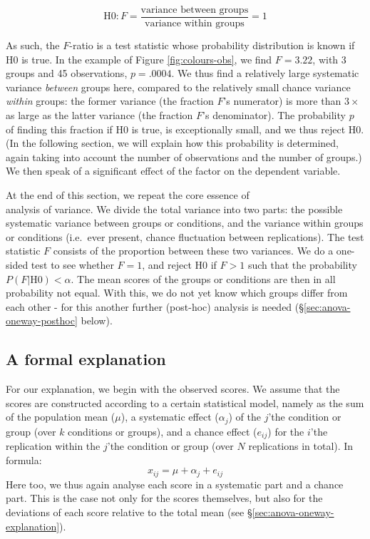 \documentclass[
]{book}
\begin{document}
\[\textrm{H0}: F = \frac{\textrm{variance between groups}}{\textrm{variance within groups}} = 1\]

As such, the \(F\)-ratio is a test statistic whose probability distribution
is known if H0 is true. In the example of Figure
\ref{fig:colours-obs}, we find \(F=3.22\), with 3 groups and 45
observations, \(p=.0004\). We thus find a relatively large systematic
variance \emph{between} groups here, compared to the relatively
small chance variance \emph{within} groups: the former variance
(the fraction \(F\)'s numerator) is more than \(3\times\) as large as the
latter variance (the fraction \(F\)'s denominator). The probability
\(p\) of finding this fraction if H0 is true, is exceptionally small,
and we thus reject H0. (In the following section, we will explain how
this probability is determined, again taking into account the number of
observations and the number of groups.) We then speak of a significant effect
of the factor on the dependent variable.

At the end of this section, we repeat the core essence of\\
analysis of variance. We divide the total variance into two parts: the
possible systematic variance between groups or conditions, and the
variance within groups or conditions (i.e.~ever present, chance
fluctuation between replications). The test statistic \(F\) consists of the
proportion between these two variances. We do a one-sided test to see
whether \(F=1\), and reject H0 if \(F>1\) such that the probability
\(P(F|\textrm{H0}) < \alpha\). The mean scores of the groups or conditions
are then in all probability not equal. With this, we do not yet know
which groups differ from each other - for this another further
(post-hoc) analysis is needed
(§\ref{sec:anova-oneway-posthoc} below).

\hypertarget{sec:anova-oneway-formal}{%
\subsection{A formal explanation}\label{sec:anova-oneway-formal}}

For our explanation, we begin with the observed scores. We assume that
the scores are constructed according to a certain statistical model, namely
as the sum of the population mean (\(\mu\)), a systematic
effect (\(\alpha_j\)) of the \(j\)'the condition or group (over \(k\) conditions
or groups), and a chance effect (\(e_{ij}\)) for the \(i\)'the replication within
the \(j\)'the condition or group (over \(N\) replications in
total). In formula:
\[x_{ij} = \mu + \alpha_{j} + e_{ij}\]
Here too, we thus again analyse each score in a systematic part and
a chance part. This is the case not only for the scores themselves, but also
for the deviations of each score relative to the total mean
(see §\ref{sec:anova-oneway-explanation}).
\end{document}
